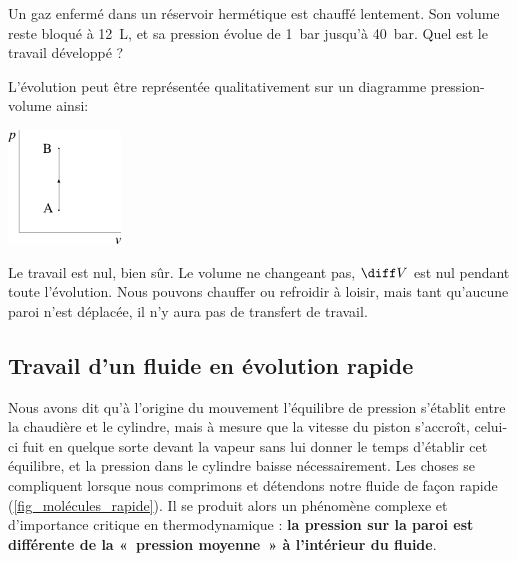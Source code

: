 			\begin{anexample}
				Un gaz enfermé dans un réservoir hermétique est chauffé lentement. Son volume reste bloqué à \SI{12}{\liter}, et sa pression évolue de \SI{1}{\bar} jusqu’à \SI{40}{\bar}. Quel est le travail développé ?
					\begin{answer}
						L’évolution peut être représentée qualitativement sur un diagramme pression-volume ainsi:
							\begin{center}
								\includegraphics[width=3cm]{images/ex_pv_isochore.png}
							\end{center}
						Le travail est nul, bien sûr. Le volume ne changeant pas, $\diff V$ est nul pendant toute l’évolution. Nous pouvons chauffer ou refroidir à loisir, mais tant qu’aucune paroi n’est déplacée, il n’y aura pas de transfert de travail.
					\end{answer}
			\end{anexample}
			

	\subsection{Travail d’un fluide en évolution rapide}
	\label{ch_évolutions_irr_sf}

			Nous avons dit qu’à l’origine du mouvement l’équilibre de pression s’établit entre la chaudière et le cylindre, mais à mesure que la vitesse du piston s’accroît, celui-ci fuit en quelque sorte devant la vapeur sans lui donner le temps d’établir cet équilibre, et la pression dans le cylindre baisse \mbox{nécessairement}.
		Les choses se compliquent lorsque nous comprimons et détendons notre fluide de façon rapide (\cref{fig_molécules_rapide}). Il se produit alors un phénomène complexe et d’importance critique en thermodynamique : \textbf{la pression sur la paroi est différente de la «~pression moyenne~» à l’intérieur du fluide}.

